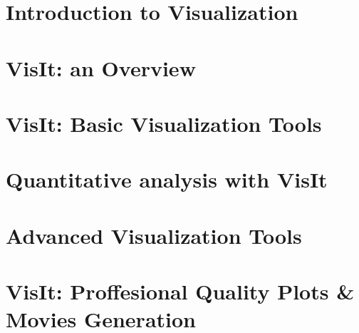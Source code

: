 \documentclass[xcolor=svgnames]{beamer}
\providecommand{\sectionpage}{\Large\centering \bf\mediumblue\insertsection}
\begin{document}
\section{Introduction to Visualization}
\frame{\sectionpage}

\section{VisIt: an Overview}
\frame{\sectionpage}

\section{VisIt: Basic Visualization Tools}
\frame{\sectionpage}

\section{Quantitative analysis with VisIt}
\frame{\sectionpage}

\section{Advanced Visualization Tools}
\frame{\sectionpage}

\section{VisIt: Proffesional Quality Plots \& Movies Generation}
\frame{\sectionpage}

\end{document}
